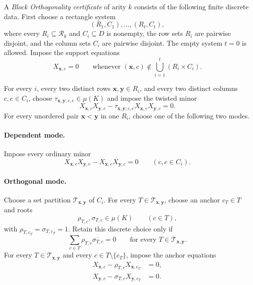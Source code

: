 \documentclass[11pt]{article}
\theoremstyle{plain}
\theoremstyle{definition}
\theoremstyle{remark}
\begin{document}
A \emph{Block Orthogonality certificate} of arity $k$ consists of the
following finite discrete data.  First choose a rectangle system
\[
  (R_1,C_1),\ldots,(R_t,C_t),
\]
where every $R_i\subseteq\mathcal R_k$ and $C_i\subseteq D$ is nonempty,
the row sets $R_i$ are pairwise disjoint, and the column sets $C_i$ are
pairwise disjoint.  The empty system $t=0$ is allowed.  Impose the support
equations
\begin{equation}
  X_{\mathbf x,c}=0
  \qquad
  \text{whenever }
  (\mathbf x,c)\notin
  \bigcup_{i=1}^t(R_i\times C_i).
  \label{eq:bo-certificate-support}
\end{equation}

For every $i$, every two distinct rows
$\mathbf x,\mathbf y\in R_i$, and every two distinct columns
$c,e\in C_i$, choose
$\tau_{\mathbf x,\mathbf y;c,e}\in\mu(K)$ and impose the twisted minor
\begin{equation}
  X_{\mathbf x,c}X_{\mathbf y,e}
  -\tau_{\mathbf x,\mathbf y;c,e}
   X_{\mathbf x,e}X_{\mathbf y,c}=0.
  \label{eq:bo-certificate-twisted-minor}
\end{equation}
For every unordered pair $\mathbf x<\mathbf y$ in one $R_i$, choose one of
the following two modes.

\paragraph{Dependent mode.}
Impose every ordinary minor
\begin{equation}
  X_{\mathbf x,c}X_{\mathbf y,e}
  -X_{\mathbf x,e}X_{\mathbf y,c}=0
  \qquad(c,e\in C_i).
  \label{eq:bo-certificate-dependent}
\end{equation}

\paragraph{Orthogonal mode.}
Choose a set partition $\mathcal T_{\mathbf x,\mathbf y}$ of $C_i$.  For
every $T\in\mathcal T_{\mathbf x,\mathbf y}$, choose an anchor $c_T\in T$
and roots
\[
  \rho_{T,c},\sigma_{T,c}\in\mu(K)
  \qquad(c\in T),
\]
with $\rho_{T,c_T}=\sigma_{T,c_T}=1$.  Retain this discrete choice only if
\begin{equation}
  \sum_{c\in T}\rho_{T,c}\overline{\sigma_{T,c}}=0
  \qquad
  \text{for every }T\in\mathcal T_{\mathbf x,\mathbf y}.
  \label{eq:bo-certificate-root-sum}
\end{equation}
For every $T\in\mathcal T_{\mathbf x,\mathbf y}$ and every
$c\in T\setminus\{c_T\}$, impose the anchor equations
\begin{align}
  X_{\mathbf x,c}-\rho_{T,c}X_{\mathbf x,c_T}&=0,
  \label{eq:bo-certificate-first-anchor}\\
  X_{\mathbf y,c}-\sigma_{T,c}X_{\mathbf y,c_T}&=0.
  \label{eq:bo-certificate-second-anchor}
\end{align}
\end{document}
